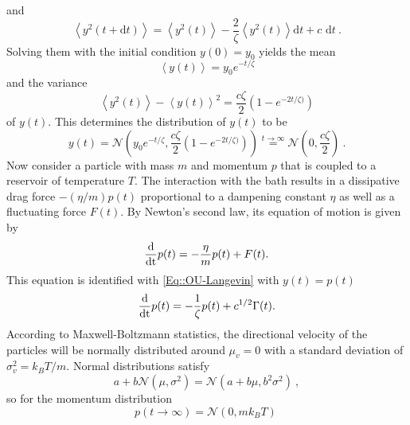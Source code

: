 	and
	\begin{equation}
		\left \langle y^2(t + \text{d}t) \right \rangle =	\left \langle y^2(t) \right \rangle - \frac{2}{\zeta} \left \langle y^2(t) \right \rangle \text{d}t  + c \text{ d}t~.
	\end{equation}
	Solving them with the initial condition $y(0) =	y_0$ yields the mean
	\begin{equation}
		\left \langle y(t) \right \rangle =	 y_0 e^{-t/\zeta}
	\end{equation}
	and the variance
	\begin{equation}
		\left \langle y^2(t) \right \rangle - \left \langle y(t) \right \rangle^2 =	\frac{c\zeta}{2} \left(1 - e^{-2t /	\zeta)}\right)
	\end{equation}
	of $y(t)$. This determines the distribution of $y(t)$ to be
	\begin{equation} \label{Eq::OU-Distribution}
		y(t) =	\mathcal{N}\left(y_0 e^{-t/\zeta}, \frac{c\zeta}{2} \left(1 - e^{-2t /	\zeta)}\right)\right) \overset{t \rightarrow \infty}{=} \mathcal{N}\left(0 , \frac{c\zeta}{2}\right) ~.
	\end{equation}
	Now consider a particle with mass $m$ and momentum $p$ that is coupled to a reservoir of temperature $T$. The interaction with the bath results in a dissipative drag force $- ({\eta}/{m}) p(t)$ proportional to a dampening constant $\eta$ as well as a fluctuating force $F(t)$. By Newton's second law, its equation of motion is given by
	\begin{equation}
		\frac{\text{d}}{\text{\text{d}t}} p(t) =	- \frac{\eta}{m} p(t) + F(t).
	\end{equation}
	This equation is identified with \autoref{Eq::OU-Langevin} with $y(t) = p(t)$
	\begin{equation}
		\frac{\text{d}}{\text{\text{d}t}} p(t) =	- \frac{1}{\zeta} p(t) + { c^{1/2}}{} \Gamma(t).
	\end{equation}
	According to Maxwell-Boltzmann statistics, the directional velocity of the particles will be normally distributed around $\mu_v = 0$ with a standard deviation of $\sigma_v^2 =	k_B T /	m$. Normal distributions satisfy
	\begin{equation}
		a + b \mathcal{N}(\mu, \sigma^2) =	\mathcal{N}(a + b\mu, b^2\sigma^2)~,
	\end{equation}
	so for the momentum distribution 
	\begin{equation} \label{Eq::Maxwell-Boltzmann}
		p(t\rightarrow \infty) =	\mathcal{N}(0, m k_B T)~
	\end{equation}
